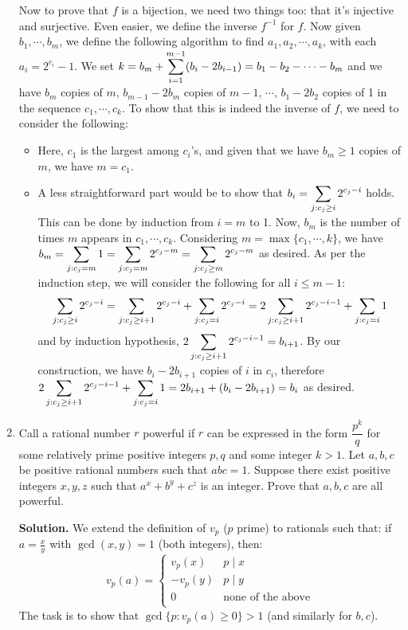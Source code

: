 \documentclass[11pt,a4paper]{article}
\begin{document}
\begin{enumerate}
	Now to prove that $f$ is a bijection, we need two things too: that it's injective and surjective. Even easier, we define the inverse $f^{-1}$ for $f$. Now given $b_1, \cdots , b_m$, we define the following algorithm to find $a_1, a_2, \cdots, a_k$, with each $a_i=2^{c_i}-1$. We set $k=b_m+\displaystyle\sum_{i=1}^{m-1}(b_i - 2b_{i-1})=b_1-b_2-\cdots - b_m$ and we have $b_m$ copies of $m$, $b_{m-1}-2b_m$ copies of $m-1$, $\cdots$, $b_1-2b_2$ copies of 1 in the sequence $c_1, \cdots , c_k$. To show that this is indeed the inverse of $f$, we need to consider the following: 
	\begin{itemize}
		\item Here, $c_1$ is the largest among $c_i$'s, and given that we have $b_m\ge 1$ copies of $m$, we have $m=c_1$. 
		
		\item A less straightforward part would be to show that $b_i=\displaystyle\sum_{j:c_j\ge i}2^{c_j-i}$ holds. This can be done by induction from $i=m$ to 1. Now, $b_m$ is the number of times $m$ appears in $c_1, \cdots , c_k$. Considering $m=\max\{c_1, \cdots , k\}$, we have $b_m=\displaystyle\sum_{j: c_j=m}1=\displaystyle\sum_{j: c_j=m}2^{c_j-m}=\displaystyle\sum_{j: c_j\ge m}2^{c_j-m}$ as desired. 
		As per the induction step, we will consider the following for all $i\le m-1$: 
		\[
		\displaystyle\sum_{j:c_j\ge i}2^{c_j-i}
		=\displaystyle\sum_{j:c_j\ge i + 1}2^{c_j-i} + \displaystyle\sum_{j:c_j= i}2^{c_j-i}
		=2\displaystyle\sum_{j:c_j\ge i + 1}2^{c_j-i - 1}+ \displaystyle\sum_{j:c_j= i}1
		\]
		and by induction hypothesis, $2\displaystyle\sum_{j:c_j\ge i + 1}2^{c_j-i - 1}=b_{i+1}$. By our construction, we have $b_i-2b_{i+1}$ copies of $i$ in $c_i$, therefore $2\displaystyle\sum_{j:c_j\ge i + 1}2^{c_j-i - 1}+ \displaystyle\sum_{j:c_j= i}1=2b_{i+1}+ (b_i-2b_{i+1})=b_i$ as desired. 
	\end{itemize}
	
	\item Call a rational number $r$ powerful if $r$ can be expressed in the form $\dfrac{p^k}{q}$ for some relatively prime positive integers $p, q$ and some integer $k >1$. Let $a, b, c$ be positive rational numbers such that $abc = 1$. Suppose there exist positive integers $x, y, z$ such that $a^x + b^y + c^z$ is an integer. Prove that $a, b, c$ are all powerful.
	
	\textbf{Solution.} We extend the definition of $v_p$ ($p$ prime) to rationals such that: if $a=\frac{x}{y}$ with $\gcd(x, y)=1$ (both integers), then:
	\[
	v_p(a)=\begin{cases}
		v_p(x) & p\mid x\\
		-v_p(y) & p\mid y\\
		0 & \text{none of the above}\\
	\end{cases}
	\]
	The task is to show that $\gcd\{p: v_p(a)\ge 0\}>1$ (and similarly for $b, c$). 
	

\end{enumerate}
\end{document}
